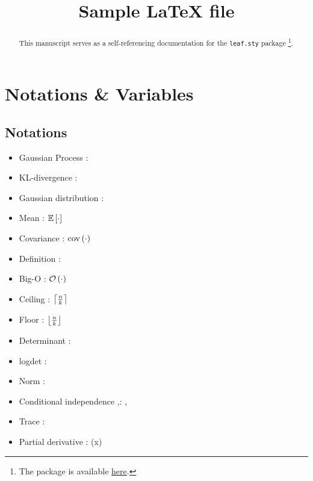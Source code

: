 \documentclass{article}
\begin{document}
\title{Sample \LaTeX{ }file}



\maketitle

\begin{abstract}%
This manuscript serves as a self-referencing documentation for the \texttt{leaf.sty} package \footnote{The package is available \href{https://github.com/activatedgeek/latexfiles}{here}.}.
\end{abstract}


\section{Notations \& Variables}

\subsection{Notations}

\begin{itemize}
\item Gaussian Process \vrb{\gp{\cdot,\cdot}}: \gp{\cdot,\cdot}
\item KL-divergence \vrb{\kl}: \kl
\item Gaussian distribution \vrb{\gaussian{}}: \gaussian{\cdot, \cdot}
\item Mean \vrb{\mean{\cdot}}: $\mathbb{E}\left[\cdot\right]$
\item Covariance \vrb{\cov{\cdor}}: $\mathrm{cov}\left(\cdot\right)$
\item Definition : 
\item Big-O \vrb{\bigo{\cdot}}:  $\mathcal{O}\left(\cdot\right)$
\item Ceiling : $\left\lceil \tfrac{n}{k} \right\rceil$
\item Floor : $\left\lfloor \tfrac{n}{k} \right\rfloor$
\item Determinant \vrb{\determ{}}: \determ{\cdot}
\item logdet \vrb{\logdet{}}: \logdet{\cdot}
\item Norm \vrb{\norm{}}: \norm{\cdot}
\item Conditional independence \vrb{\ci},\vrb{\nci}: \ci, \nci
\item Trace \vrb{\tr{}}: \tr{\cdot}
\item Partial derivative \vrb{\pd{}{}}: (x)
\end{itemize}
\end{document}
